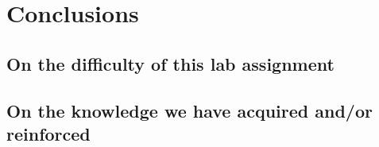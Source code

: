 \chapter{Conclusions}
\label{chapter: conclusions}

\section{On the difficulty of this lab assignment}

\paragraph{}

\section{On the knowledge we have acquired and/or reinforced}

\paragraph{}
